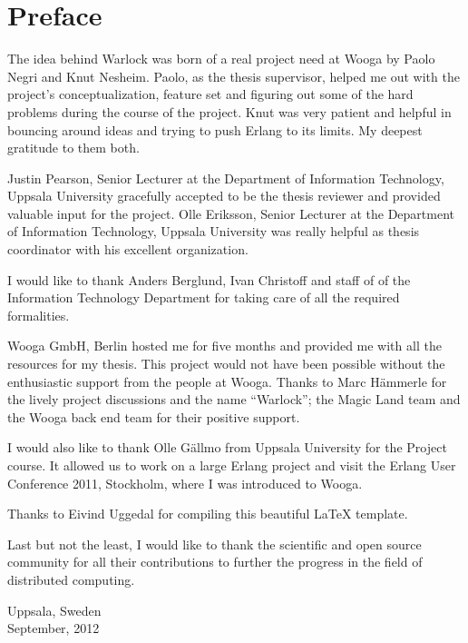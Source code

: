 \chapter{Preface}

The idea behind Warlock was born of a real project need at Wooga by Paolo Negri
and Knut Nesheim. Paolo, as the thesis supervisor, helped me out with the
project's conceptualization, feature set and figuring out some of the hard 
problems during the course of the project. Knut was very patient and helpful
in bouncing around ideas and trying to push Erlang to its limits. My deepest
gratitude to them both.

Justin Pearson, Senior Lecturer at the Department of Information Technology,
Uppsala University gracefully accepted to be the thesis reviewer and provided
valuable input for the project. Olle Eriksson, Senior Lecturer at the Department
of Information Technology, Uppsala University was really helpful as thesis
coordinator with his excellent organization.

I would like to thank Anders Berglund, Ivan Christoff and staff of 
of the Information Technology Department for taking care of all the required 
formalities.

Wooga GmbH, Berlin hosted me for five months and provided me with all the 
resources for my thesis. This project would not have 
been possible without the enthusiastic support from the people 
at Wooga. Thanks to Marc Hämmerle for the lively project discussions and the
name ``Warlock''; the Magic Land team and the Wooga back end team for their
positive support.

I would also like to thank Olle Gällmo from Uppsala University for the
Project  course. It allowed us to work on a large Erlang project and
visit the Erlang User Conference 2011, Stockholm, where I was
introduced to Wooga.

Thanks to Eivind Uggedal for compiling this beautiful {\LaTeX} template.

Last but not the least, I would like to thank the scientific and open
source community for all their contributions to further the progress in the
field of distributed computing.\\


\raggedright{Uppsala, Sweden \\
September, 2012}

